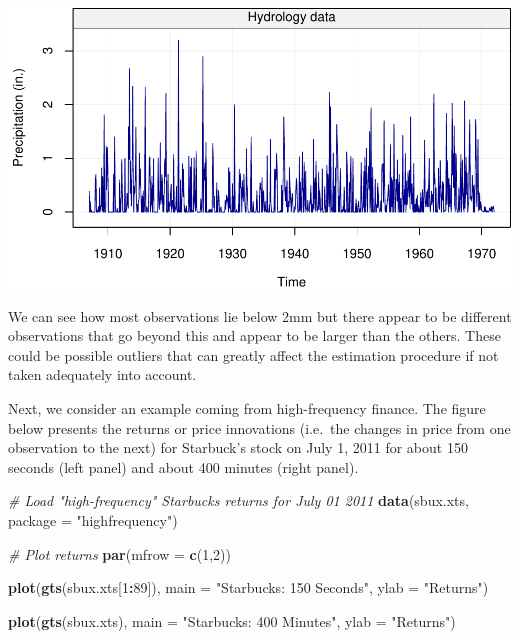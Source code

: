 \documentclass[]{book}
\newenvironment{Shaded}{\begin{snugshade}}{\end{snugshade}}
\newcommand{\CommentTok}[1]{\textcolor[rgb]{0.56,0.35,0.01}{\textit{#1}}}
\newcommand{\DataTypeTok}[1]{\textcolor[rgb]{0.13,0.29,0.53}{#1}}
\newcommand{\DecValTok}[1]{\textcolor[rgb]{0.00,0.00,0.81}{#1}}
\newcommand{\KeywordTok}[1]{\textcolor[rgb]{0.13,0.29,0.53}{\textbf{#1}}}
\newcommand{\NormalTok}[1]{#1}
\newcommand{\OperatorTok}[1]{\textcolor[rgb]{0.81,0.36,0.00}{\textbf{#1}}}
\newcommand{\StringTok}[1]{\textcolor[rgb]{0.31,0.60,0.02}{#1}}
\theoremstyle{definition}
\theoremstyle{definition}
\theoremstyle{definition}
\theoremstyle{remark}
\begin{document}
\begin{center}\includegraphics{ts_files/figure-latex/example_hydro-1} \end{center}

We can see how most observations lie below 2mm but there appear to be
different observations that go beyond this and appear to be larger than
the others. These could be possible outliers that can greatly affect the
estimation procedure if not taken adequately into account.

Next, we consider an example coming from high-frequency finance. The
figure below presents the returns or price innovations (i.e.~the changes
in price from one observation to the next) for Starbuck's stock on July
1, 2011 for about 150 seconds (left panel) and about 400 minutes (right
panel).

\begin{Shaded}
\begin{Highlighting}[]
\CommentTok{# Load "high-frequency" Starbucks returns for July 01 2011}
\KeywordTok{data}\NormalTok{(sbux.xts, }\DataTypeTok{package =} \StringTok{"highfrequency"}\NormalTok{)}

\CommentTok{# Plot returns}
\KeywordTok{par}\NormalTok{(}\DataTypeTok{mfrow =} \KeywordTok{c}\NormalTok{(}\DecValTok{1}\NormalTok{,}\DecValTok{2}\NormalTok{))}

\KeywordTok{plot}\NormalTok{(}\KeywordTok{gts}\NormalTok{(sbux.xts[}\DecValTok{1}\OperatorTok{:}\DecValTok{89}\NormalTok{]), }
     \DataTypeTok{main =} \StringTok{"Starbucks: 150 Seconds"}\NormalTok{, }
     \DataTypeTok{ylab =} \StringTok{"Returns"}\NormalTok{) }

\KeywordTok{plot}\NormalTok{(}\KeywordTok{gts}\NormalTok{(sbux.xts), }
     \DataTypeTok{main =} \StringTok{"Starbucks: 400 Minutes"}\NormalTok{, }
     \DataTypeTok{ylab =} \StringTok{"Returns"}\NormalTok{)}
\end{Highlighting}
\end{Shaded}
\end{document}
